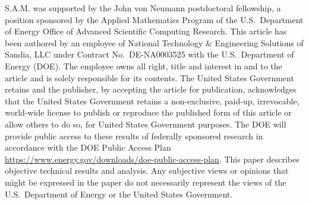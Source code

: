 \documentclass[acmsmall,screen,review]{acmart}
\begin{document}
\maketitle



\begin{acks}
S.A.M. was supported by the John von Neumann postdoctoral fellowship, a position sponsored by the Applied Mathematics Program of the U.S.~Department of Energy Office of Advanced Scientific Computing Research.
This article has been authored by an employee of National Technology \& Engineering Solutions of Sandia, LLC under Contract No.~DE-NA0003525 with the U.S.~Department of Energy (DOE). The employee owns all right, title and interest in and to the article and is solely responsible for its contents.
The United States Government retains and the publisher, by accepting the article for publication, acknowledges that the United States Government retains a non-exclusive, paid-up, irrevocable, world-wide license to publish or reproduce the published form of this article or allow others to do so, for United States Government purposes. The DOE will provide public access to these results of federally sponsored research in accordance with the DOE Public Access Plan \url{https://www.energy.gov/downloads/doe-public-access-plan}.
This paper describes objective technical results and analysis. Any subjective views or opinions that might be expressed in the paper do not necessarily represent the views of the U.S.~Department of Energy or the United States Government.
\end{acks}




\appendix


\end{document}
